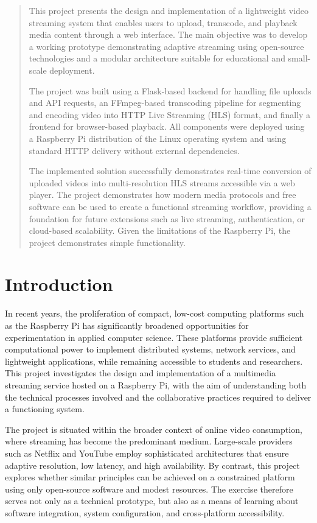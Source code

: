 \documentclass[11pt]{article}
\begin{document}
\begin{abstract}
This project presents the design and implementation of a lightweight video streaming system that enables users to upload, transcode, and playback media content through a web interface. The main objective was to develop a working prototype demonstrating adaptive streaming using open-source technologies and a modular architecture suitable for educational and small-scale deployment. 

The project was built using a Flask-based backend for handling file uploads and API requests, an FFmpeg-based transcoding pipeline for segmenting and encoding video into HTTP Live Streaming (HLS) format, and finally a frontend for browser-based playback. All components were deployed using a Raspberry Pi distribution of the Linux operating system and using standard HTTP delivery without external dependencies. 

The implemented solution successfully demonstrates real-time conversion of uploaded videos into multi-resolution HLS streams accessible via a web player. The project demonstrates how modern media protocols and free software can be used to create a functional streaming workflow, providing a foundation for future extensions such as live streaming, authentication, or cloud-based scalability. Given the limitations of the Raspberry Pi, the project demonstrates simple functionality.
\end{abstract}

\newpage

\tableofcontents
\newpage
\section{Introduction}
In recent years, the proliferation of compact, low-cost computing platforms such as the Raspberry Pi has significantly broadened opportunities for experimentation in applied computer science. These platforms provide sufficient computational power to implement distributed systems, network services, and lightweight applications, while remaining accessible to students and researchers. This project investigates the design and implementation of a multimedia streaming service hosted on a Raspberry Pi, with the aim of understanding both the technical processes involved and the collaborative practices required to deliver a functioning system.

The project is situated within the broader context of online video consumption, where streaming has become the predominant medium. Large-scale providers such as Netflix and YouTube employ sophisticated architectures that ensure adaptive resolution, low latency, and high availability. By contrast, this project explores whether similar principles can be achieved on a constrained platform using only open-source software and modest resources. The exercise therefore serves not only as a technical prototype, but also as a means of learning about software integration, system configuration, and cross-platform accessibility.
\end{document}
